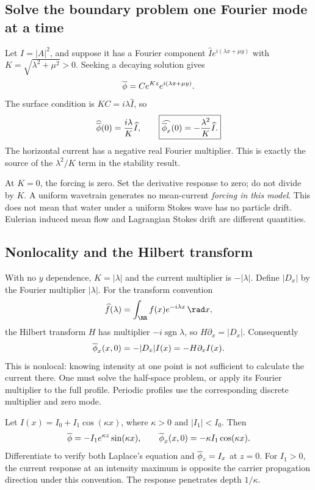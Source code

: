 \subsection{Solve the boundary problem one Fourier mode at a time}
Let $I=|A|^2$, and suppose it has a Fourier component
$\widehat I e^{i(\lambda x+\mu y)}$ with
$K=\sqrt{\lambda^2+\mu^2}>0$. Seeking a decaying solution gives
\[
 \overline{\phi}=C e^{Kz}e^{i(\lambda x+\mu y)}.
\]
The surface condition is $KC=i\lambda\widehat I$, so
\begin{equation}\label{eq:mean-symbol}
 \widehat{\overline{\phi}}(0)=\frac{i\lambda}{K}\widehat I,
 \qquad
 \boxed{\widehat{\overline{\phi}_x}(0)=-\frac{\lambda^2}{K}\widehat I.}
\end{equation}
The horizontal current has a negative real Fourier multiplier. This is
exactly the source of the $\lambda^2/K$ term in the stability result.

At $K=0$, the forcing is zero. Set the derivative response to zero;
do not divide by $K$. A uniform wavetrain generates no mean-current
\emph{forcing in this model}. This does not mean that water under a
uniform Stokes wave has no particle drift. Eulerian induced mean flow and
Lagrangian Stokes drift are different quantities.

\subsection{Nonlocality and the Hilbert transform}
With no $y$ dependence, $K=|\lambda|$ and the current multiplier is
$-|\lambda|$. Define $|D_x|$ by the Fourier multiplier $|\lambda|$.
For the transform convention
\[
 \widehat f(\lambda)=\int_{\RR}f(x)e^{-i\lambda x}\,\rad x,
\]
the Hilbert transform $H$ has multiplier $-i\operatorname{sgn}\lambda$,
so $H\partial_x=|D_x|$. Consequently
\begin{equation}\label{eq:hilbert}
 \overline{\phi}_x(x,0)=-|D_x|I(x)=-H\partial_x I(x).
\end{equation}
This is nonlocal: knowing intensity at one point is not sufficient to
calculate the current there. One must solve the half-space problem, or
apply its Fourier multiplier to the full profile. Periodic profiles use
the corresponding discrete multiplier and zero mode.

\begin{example}
Let $I(x)=I_0+I_1\cos(\kappa x)$, where $\kappa>0$ and
$|I_1|<I_0$. Then
\[
 \overline{\phi}=-I_1e^{\kappa z}\sin(\kappa x),\qquad
 \overline{\phi}_x(x,0)=-\kappa I_1\cos(\kappa x).
\]
Differentiate to verify both Laplace's equation and
$\overline{\phi}_z=I_x$ at $z=0$. For $I_1>0$, the current response at an intensity
maximum is opposite the carrier propagation direction under this convention.
The response penetrates depth $1/\kappa$.
\end{example}

